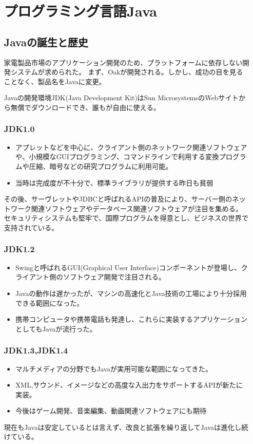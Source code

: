 \documentclass[12pt,a4j,twoside]{jsbook}
\begin{document}
\section{プログラミング言語Java}
\subsection{Javaの誕生と歴史}
家電製品市場のアプリケーション開発のため、プラットフォームに依存しない開発システムが求められた。
まず、Oakが開発される。しかし、成功の目を見ることなく、製品名をJavaに変更。

Javaの開発環境JDK(Java Development Kit)はSun MicrosystemsのWebサイトから無償でダウンロードでき、誰もが自由に使える。
\subsubsection*{JDK1.0}
\begin{itemize}
    \item アプレットなどを中心に、クライアント側のネットワーク関連ソフトウェアや、小規模なGUIプログラミング、コマンドラインで利用する変換プログラムや圧縮、暗号などの研究プログラムに利用可能。
    \item 当時は完成度が不十分で、標準ライブラリが提供する昨日も貧弱
\end{itemize}

その後、サーヴレットやJDBCと呼ばれるAPIの普及により、サーバー側のネットワーク関連ソフトウェアやデータベース関連ソフトウェアが注目を集める。
セキュリティシステムも堅牢で、国際プログラムを得意とし、ビジネスの世界で支持されている。
\subsubsection*{JDK1.2}
\begin{itemize}
    \item Swingと呼ばれるGUI(Graphical User Interface)コンポーネントが登場し、クライアント側のソフトウェア開発で注目される。
    \item Javaの動作は遅かったが、マシンの高速化とJava技術の工場により十分採用できる範囲になった。
    \item 携帯コンピュータや携帯電話も発達し、これらに実装するアプリケーションとしてもJavaが流行った。
\end{itemize}
\subsubsection*{JDK1.3,JDK1.4}
\begin{itemize}
    \item マルチメディアの分野でもJavaが実用可能な範囲になってきた。
    \item XML,サウンド、イメージなどの高度な入出力をサポートするAPIが新たに実装。
    \item 今後はゲーム開発、音楽編集、動画関連ソフトウェアにも期待
\end{itemize}
現在もJavaは安定しているとは言えず、改良と拡張を繰り返してJavaは進化し続けている。
\end{document}
